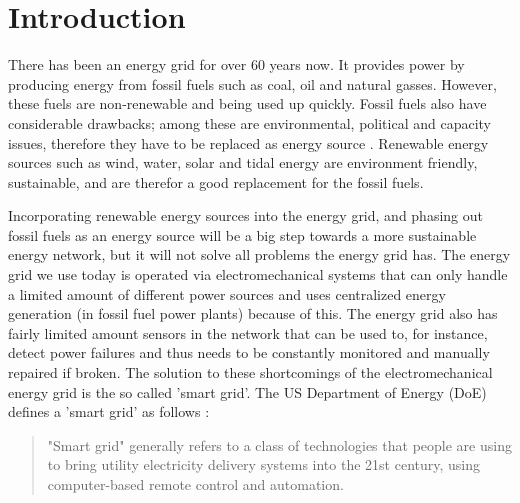 \section{Introduction}

There has been an energy grid for over 60 years now. It provides power by producing energy from fossil fuels such as coal, oil and natural gasses. However, these fuels are non-renewable and being used up quickly. Fossil fuels also have considerable drawbacks; among these are environmental, political and capacity issues, therefore they have to be replaced as energy source \cite{friedman2008hot}. Renewable energy sources such as wind, water, solar and tidal energy \cite{Tromly2001} are environment friendly, sustainable, and are therefor a good replacement for the fossil fuels.

Incorporating renewable energy sources into the energy grid, and phasing out fossil fuels as an energy source will be a big step towards a more sustainable energy network, but it will not solve all problems the energy grid has. The energy grid we use today is operated via electromechanical systems that can only handle a limited amount of different power sources and uses centralized energy generation (in fossil fuel power plants) because of this. The energy grid also has fairly limited amount sensors in the network that can be used to, for instance, detect power failures and thus needs to be constantly monitored and manually repaired if broken. The solution to these shortcomings of the electromechanical energy grid is the so called 'smart grid'. The US Department of Energy (DoE) defines a 'smart grid' as follows \cite{doe}: 
 
\begin{quote}
"Smart grid" generally refers to a class of technologies that people are using to bring utility electricity delivery systems into the 21st century, using computer-based remote control and automation.
\end{quote}

